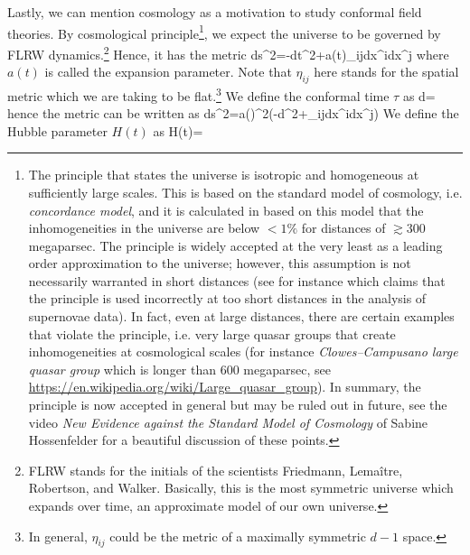\documentclass[12pt]{article}
\numberwithin{equation}{section}
\begin{document}
Lastly, we can mention cosmology as a motivation to study conformal field theories. By cosmological principle\footnote{The principle that states the universe is isotropic and homogeneous at sufficiently large scales. This is based on the standard model of cosmology, i.e. \emph{concordance model}, and it is calculated in \cite{Hunt:2008wp} based on this model that the inhomogeneities in the universe are below $<1\%$ for distances of $\gtrsim300$ megaparsec. The principle is widely accepted at the very least as a leading order approximation to the universe; however, this assumption is not necessarily warranted in short distances (see for instance \cite{Colin:2019opb} which claims that the principle is used incorrectly at too short distances in the analysis of supernovae data). In fact, even at large distances, there are certain examples that violate the principle, i.e. very large quasar groups that create inhomogeneities at cosmological scales (for instance \emph{Clowes–Campusano large quasar group} which is longer than $600$ megaparsec, see \hyperref{https://en.wikipedia.org/wiki/Large\_quasar\_group}{}{}{https://en.wikipedia.org/wiki/Large\_quasar\_group}). In summary, the principle is now accepted in general but may be ruled out in future, see the video \emph{New Evidence against the Standard Model of Cosmology} of Sabine Hossenfelder for a beautiful discussion of these points.
}, we expect the universe to be governed by FLRW dynamics.\footnote{FLRW stands for the initials of the scientists Friedmann, Lemaître, Robertson, and Walker. Basically, this is the most symmetric universe which expands over time, an approximate model of our own universe.} Hence, it has the metric
\be 
ds^2=-dt^2+a(t)\eta_{ij}dx^idx^j
\ee 
where $a(t)$ is called the expansion parameter. Note that $\eta_{ij}$ here stands for the spatial metric which we are taking to be flat.\footnote{In general, $\eta_{ij}$ could be the metric of a maximally symmetric $d-1$ space.} We define the conformal time $\tau$ as
\be 
d\tau=
\ee 
hence the metric can be written as 
\be 
\label{eq: FRW metric in conformal time}
ds^2=a(\tau)^2\left(-d\tau^2+\eta_{ij}dx^idx^j\right)
\ee
We define the Hubble parameter $H(t)$ as 
\be 
H(t)=
\ee  
\end{document}
